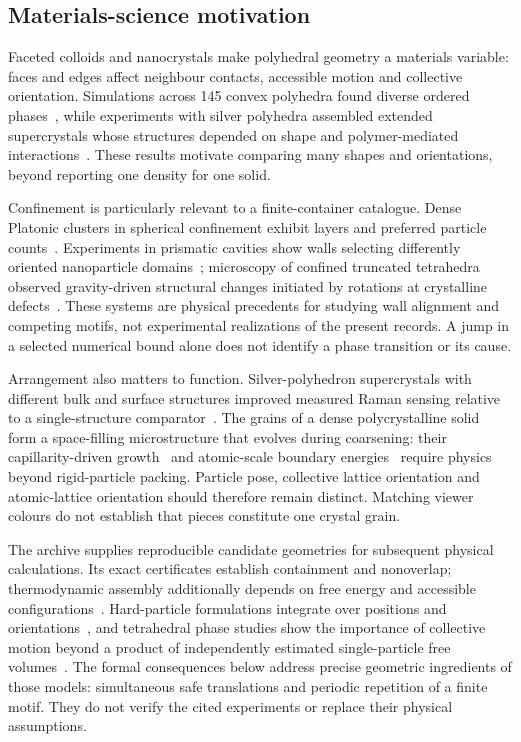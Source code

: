 \documentclass[11pt,a4paper]{article}
\begin{document}
\subsection{Materials-science motivation}\label{sec:materials}
Faceted colloids and nanocrystals make polyhedral geometry a materials variable:
faces and edges affect neighbour contacts, accessible motion and collective
orientation. Simulations across 145 convex polyhedra found diverse ordered
phases~\cite{damasceno2012}, while experiments with silver polyhedra assembled
extended supercrystals whose structures depended on shape and polymer-mediated
interactions~\cite{henzie2012}. These results motivate comparing many shapes and
orientations, beyond reporting one density for one solid.

Confinement is particularly relevant to a finite-container catalogue. Dense
Platonic clusters in spherical confinement exhibit layers and preferred particle
counts~\cite{teich2016}. Experiments in prismatic cavities show walls selecting
differently oriented nanoparticle domains~\cite{chaabani2024}; microscopy of
confined truncated tetrahedra observed gravity-driven structural changes
initiated by rotations at crystalline defects~\cite{doan2024}. These systems
are physical precedents for studying wall alignment and competing motifs, not
experimental realizations of the present records. A jump in a selected numerical
bound alone does not identify a phase transition or its cause.

Arrangement also matters to function. Silver-polyhedron supercrystals with
different bulk and surface structures improved measured Raman sensing relative
to a single-structure comparator~\cite{lee2018}. The grains of a dense
polycrystalline solid form a space-filling microstructure that evolves during
coarsening: their capillarity-driven growth~\cite{macpherson2007} and atomic-scale boundary
energies~\cite{olmsted2009} require physics beyond rigid-particle packing.
Particle pose, collective lattice orientation and atomic-lattice orientation
should therefore remain distinct. Matching viewer colours do not establish
that pieces constitute one crystal grain.

The archive supplies reproducible candidate geometries for subsequent physical
calculations. Its exact certificates establish containment and nonoverlap;
thermodynamic assembly additionally depends on free energy and accessible
configurations~\cite{cersonsky2018}. Hard-particle formulations integrate over
positions and orientations~\cite{vananders2014}, and tetrahedral phase studies
show the importance of collective motion beyond a product of independently
estimated single-particle free volumes~\cite{haji2011}. The formal consequences
below address precise geometric ingredients of those models: simultaneous safe
translations and periodic repetition of a finite motif. They do not verify the
cited experiments or replace their physical assumptions.
\end{document}
